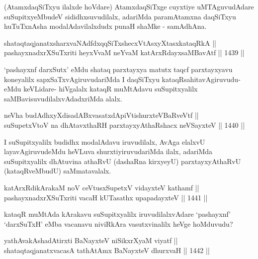 \begin{artha}
(AtamxdaqSiTxyu ilalxde hoVdare) AtamxdaqSiTxge cuyxtiye uMTAguvudAdare suSupitxyeMbudeV sididhxsuvudilalx, adariMda paramAtamxna daqSiTxyu huTuTxnAsha modalAdavilalxdudx punaH shaMke - samAdhAna.
\end{artha}

\begin{shl}
shataqtaqjanatxsharxvaNAdfdxqqSiTxshecxVtAsxyXtasxkataqRkA || \\
pashayxnadxrXSuTxriti heyxVvaM neYvaM katArxRdayxsaMBavAtf \hfill || 1439 || 
\end{shl}

\begin{artha}
`pashayxnf darxSutx' eMdu shataq parxtayxya matutx taqcf parxtayxyavu koneyalilx sapxSaTxvAgiruvudariMda I daqSiTxyu kataqRsahitavAgiruvudu- eMdu keVLidare- hiVgalalx kataqR muMtAdavu suSupitxyalilx saMBavisuvudilalxvAdadxriMda alalx.
\end{artha}

\begin{shl}
neVha budAdhxyXdisadABxvasatxdA\s piVtishurxteVBaRveVtf ||  \\
suSupetxV\s toV na dhAtavxthaRH parxtayxyAthaRshacx neVSayxteV \hfill || 1440 || 
\end{shl}

\begin{artha}
I suSupitxyalilx budidhx modalAdavu iruvudilalx, AvAga elalxvU layavAgiruvudeMdu heVLuva shurxtiyiruvudariMda ilalx, adariMda suSupitxyalilx dhAtuvina athaRvU (dashaRna kirxyeyU) parxtayxyAthaRvU (kataqRveMbudU) saMmatavalalx.
\end{artha}


\begin{shl}
katArxRdikArakaM noV ceVtusxSupetxV vidayxteV kathamf || \\
pashayxnadxrXSuTxriti vacaH kUTasathx upapadayxteV \hfill || 1441 ||  
\end{shl}

\begin{artha}
kataqR muMtAda kArakavu suSupitxyalilx iruvudilalxvAdare `pashayxnf' `darxSuTxH' eMba vacanavu niviRkAra vasutxvinalilx heVge hoMduvudu?
\end{artha}

\begin{shl}
yathA\s vakAshadAtirxti BaNayxteV niSikxrXyaM viyatf ||  \\
shataqtaqjanatxvacasA tathA\s \s tAmx BaNayxteV dhurxvaH \hfill || 1442 ||  
\end{shl}


